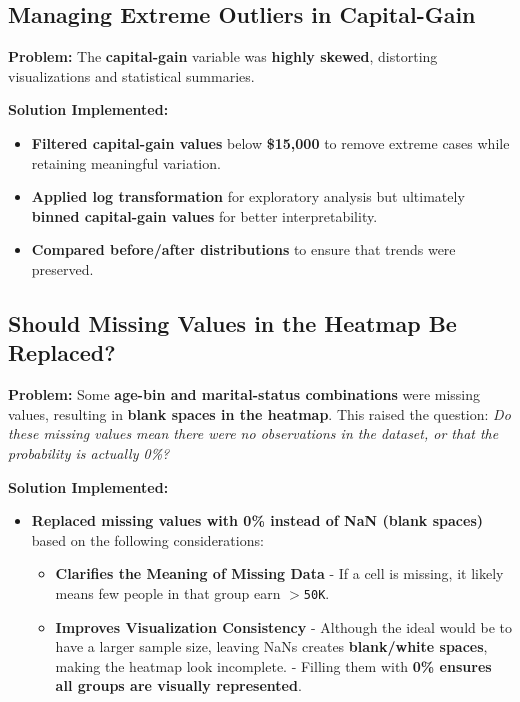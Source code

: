 \documentclass[journal,onecolumn]{IEEEtran}
\begin{document}
\subsection{Managing Extreme Outliers in Capital-Gain}

\textbf{Problem:}  
The \textbf{capital-gain} variable was \textbf{highly skewed}, distorting visualizations and statistical summaries.  

\textbf{Solution Implemented:}  
\begin{itemize}
    \item \textbf{Filtered capital-gain values} below \textbf{\$15,000} to remove extreme cases while retaining meaningful variation.  
    \item \textbf{Applied log transformation} for exploratory analysis but ultimately \textbf{binned capital-gain values} for better interpretability.  
    \item \textbf{Compared before/after distributions} to ensure that trends were preserved.  
\end{itemize}

\subsection{Should Missing Values in the Heatmap Be Replaced?}

\textbf{Problem:}  
Some \textbf{age-bin and marital-status combinations} were missing values, resulting in \textbf{blank spaces in the heatmap}.  
This raised the question:  
\textit{Do these missing values mean there were no observations in the dataset, or that the probability is actually 0\%?}  

\textbf{Solution Implemented:}  
\begin{itemize}
    \item \textbf{Replaced missing values with 0\% instead of NaN (blank spaces)} based on the following considerations:  
    \begin{itemize}
        \item \textbf{Clarifies the Meaning of Missing Data}  
        - If a cell is missing, it likely means few people in that group earn \texttt{$>$50K}. 
        \item \textbf{Improves Visualization Consistency}  
        - Although the ideal would be to have a larger sample size, leaving NaNs creates \textbf{blank/white spaces}, making the heatmap look incomplete.  
        - Filling them with \textbf{0\% ensures all groups are visually represented}.  
    
    \end{itemize}
\end{itemize}
\end{document}
